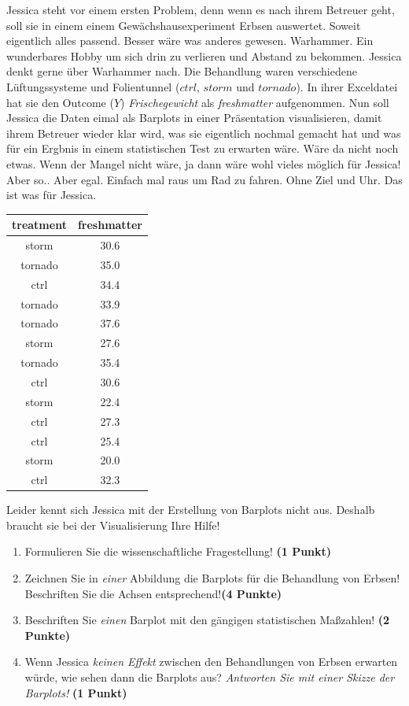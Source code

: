 \documentclass[a4paper, 9pt]{scrartcl}\usepackage[]{graphicx}\usepackage[]{xcolor}
\begin{document}
Jessica steht vor einem ersten Problem, denn wenn es nach ihrem Betreuer geht, soll sie in einem einem Gewächshausexperiment Erbsen auswertet. Soweit eigentlich alles passend. Besser wäre was anderes gewesen. Warhammer. Ein wunderbares Hobby um sich drin zu verlieren und Abstand zu bekommen. Jessica denkt gerne über Warhammer nach. Die Behandlung waren verschiedene Lüftungssysteme und Folientunnel ($ctrl$, $storm$ und $tornado$). In ihrer Exceldatei hat sie den Outcome ($Y$) \textit{Frischegewicht} als \textit{freshmatter} aufgenommen. Nun soll Jessica die Daten eimal als Barplots in einer Präsentation visualisieren, damit ihrem Betreuer wieder klar wird, was sie eigentlich nochmal gemacht hat und was für ein Ergbnis in einem statistischen Test zu erwarten wäre. Wäre da nicht noch etwas. Wenn der Mangel nicht wäre, ja dann wäre wohl vieles möglich für Jessica! Aber so.. Aber egal. Einfach mal raus um Rad zu fahren. Ohne Ziel und Uhr. Das ist was für Jessica.

\begin{table}[!h]
\centering
\begin{tabular}{cc}
\toprule
treatment & freshmatter\\
\midrule
storm & 30.6\\
tornado & 35.0\\
ctrl & 34.4\\
tornado & 33.9\\
tornado & 37.6\\
\addlinespace
storm & 27.6\\
tornado & 35.4\\
ctrl & 30.6\\
storm & 22.4\\
ctrl & 27.3\\
\addlinespace
ctrl & 25.4\\
storm & 20.0\\
ctrl & 32.3\\
\bottomrule
\end{tabular}
\end{table}



Leider kennt sich Jessica mit der Erstellung von Barplots nicht aus. Deshalb braucht sie bei der Visualisierung Ihre Hilfe!

\begin{enumerate}
\item Formulieren Sie die wissenschaftliche Fragestellung! \textbf{(1 Punkt)}
\item Zeichnen Sie in \textit{einer} Abbildung die Barplots für die Behandlung von Erbsen! Beschriften Sie die Achsen entsprechend!\textbf{(4 Punkte)}
\item Beschriften Sie \textit{einen} Barplot mit den gängigen statistischen Maßzahlen! \textbf{(2 Punkte)}
\item Wenn Jessica \textit{keinen Effekt} zwischen den Behandlungen von Erbsen erwarten würde, wie sehen dann die Barplots aus? \textit{Antworten Sie mit einer Skizze der Barplots!}
  \textbf{(1 Punkt)}
\end{enumerate} 
\clearpage
\end{document}
